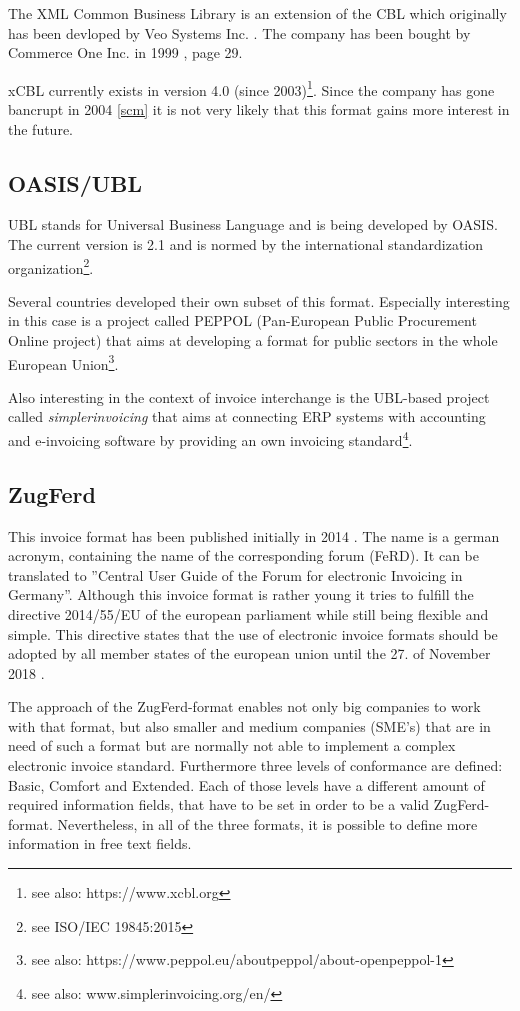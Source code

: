 \documentclass[english,mt]{lmedoc}
\begin{document}
The XML Common Business Library is an extension of the CBL which originally has been devloped by Veo Systems Inc. \cite{coverpages}. The company has been bought by Commerce One Inc. in 1999 \cite{co}, page 29. 

xCBL currently exists in version 4.0 (since 2003)\footnote{see also: https://www.xcbl.org}. Since the company has gone bancrupt in 2004 \ref{scm} it is not very likely that this format gains more interest in the future.

\subsection{OASIS/UBL}
\label{sec2.1.3}

UBL stands for Universal Business Language and is being developed by OASIS. The current version is 2.1 and is normed by the international standardization organization\footnote{see ISO/IEC 19845:2015}.

Several countries developed their own subset of this format. Especially interesting in this case is a project called PEPPOL (Pan-European Public Procurement Online project) that aims at developing a format for public sectors in the whole European Union\footnote {see also: https://www.peppol.eu/about\textunderscore peppol/about-openpeppol-1}. 

Also interesting in the context of invoice interchange is the UBL-based project called \emph{simplerinvoicing} that aims at connecting ERP systems with accounting and e-invoicing software by providing an own invoicing standard\footnote {see also: www.simplerinvoicing.org/en/}. 

\subsection{ZugFerd}
\label{sec.2.1.4}

This invoice format has been published initially in 2014 \cite{ferdIntro}. The name is a german acronym, containing the name of the corresponding forum (FeRD). It can be translated to ''Central User Guide of the Forum for electronic Invoicing in Germany''. 
Although this invoice format is rather young it tries to fulfill the directive 2014/55/EU of the european parliament \cite{dir1455} while still being flexible and simple. This directive states that the use of electronic invoice formats should be adopted by all member states of the european union until the 27. of November 2018 \cite{dir1455, Article 11}. 
 
The approach of the ZugFerd-format enables not only big companies to work with that format, but also smaller and medium companies (SME's) that are in need of such a format but are normally not able to implement a complex electronic invoice standard. 
Furthermore three levels of conformance are defined: Basic, Comfort and Extended. Each of those levels have a different amount of required information fields, that have to be set in order to be a valid ZugFerd-format. Nevertheless, in all of the three formats, it is possible to define more information in free text fields. 
\end{document}
